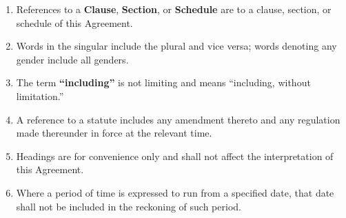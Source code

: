 \begin{enumerate}[leftmargin=*, label=\textbf{\arabic{section}.\arabic*.}]
  \item References to a \textbf{Clause}, \textbf{Section}, or \textbf{Schedule}
        are to a clause, section, or schedule of this Agreement.
  \item Words in the singular include the plural and vice versa; words denoting
        any gender include all genders.
  \item The term \textbf{``including''} is not limiting and means ``including,
        without limitation.''
  \item A reference to a statute includes any amendment thereto and any
        regulation made thereunder in force at the relevant time.
  \item Headings are for convenience only and shall not affect the interpretation
        of this Agreement.
  \item Where a period of time is expressed to run from a specified date, that
        date shall not be included in the reckoning of such period.
\end{enumerate}
